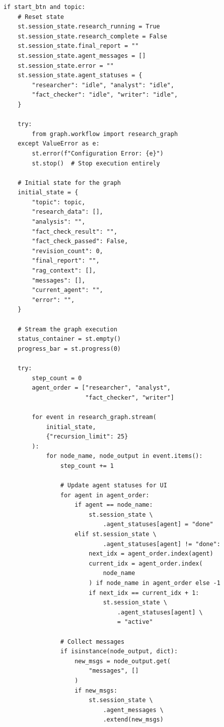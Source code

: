 \documentclass[12pt, a4paper]{article}
\begin{document}
\begin{lstlisting}[style=pythonstyle, title={\color{accentgreen}\faIcon{file} app.py --- Research Pipeline Execution}]
if start_btn and topic:
    # Reset state
    st.session_state.research_running = True
    st.session_state.research_complete = False
    st.session_state.final_report = ""
    st.session_state.agent_messages = []
    st.session_state.error = ""
    st.session_state.agent_statuses = {
        "researcher": "idle", "analyst": "idle",
        "fact_checker": "idle", "writer": "idle",
    }

    try:
        from graph.workflow import research_graph
    except ValueError as e:
        st.error(f"Configuration Error: {e}")
        st.stop()  # Stop execution entirely

    # Initial state for the graph
    initial_state = {
        "topic": topic,
        "research_data": [],
        "analysis": "",
        "fact_check_result": "",
        "fact_check_passed": False,
        "revision_count": 0,
        "final_report": "",
        "rag_context": [],
        "messages": [],
        "current_agent": "",
        "error": "",
    }

    # Stream the graph execution
    status_container = st.empty()
    progress_bar = st.progress(0)

    try:
        step_count = 0
        agent_order = ["researcher", "analyst",
                       "fact_checker", "writer"]

        for event in research_graph.stream(
            initial_state,
            {"recursion_limit": 25}
        ):
            for node_name, node_output in event.items():
                step_count += 1

                # Update agent statuses for UI
                for agent in agent_order:
                    if agent == node_name:
                        st.session_state \
                            .agent_statuses[agent] = "done"
                    elif st.session_state \
                            .agent_statuses[agent] != "done":
                        next_idx = agent_order.index(agent)
                        current_idx = agent_order.index(
                            node_name
                        ) if node_name in agent_order else -1
                        if next_idx == current_idx + 1:
                            st.session_state \
                                .agent_statuses[agent] \
                                = "active"

                # Collect messages
                if isinstance(node_output, dict):
                    new_msgs = node_output.get(
                        "messages", []
                    )
                    if new_msgs:
                        st.session_state \
                            .agent_messages \
                            .extend(new_msgs)


\end{lstlisting}
\end{document}
